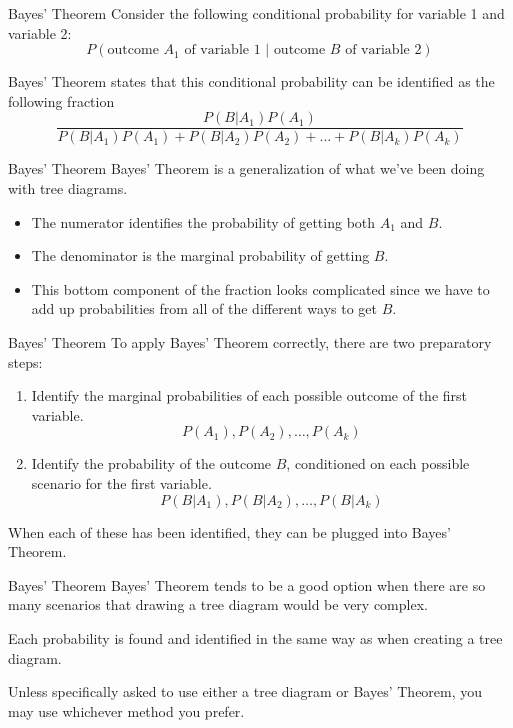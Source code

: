 \begin{frame}{Bayes' Theorem}
    Consider the following conditional probability for variable 1 and variable 2: 
    \[
    P(\text{outcome }A_1\text{ of variable 1 }|\text{ outcome }B\text{ of variable 2})
    \]
    
    Bayes’ Theorem states that this conditional probability can be identified as the following fraction
    \[
        \frac{P(B|A_1)P(A_1)}{P(B|A_1)P(A_1)+P(B|A_2)P(A_2)+\dots +P(B|A_k)P(A_k)}
    \]
\end{frame}

\begin{frame}{Bayes' Theorem}
    Bayes' Theorem is a generalization of what we've been doing with tree diagrams. 
    \begin{itemize}
        \item The numerator identifies the probability of getting both $A_1$ and $B$. 
        \item The denominator is the marginal probability of getting $B$. 
        \item This bottom component of the fraction looks complicated since we have to add up probabilities from all of the different ways to get $B$. 
    \end{itemize}
\end{frame}

\begin{frame}{Bayes' Theorem}
    To apply Bayes’ Theorem correctly, there are two preparatory steps:
    \begin{enumerate}
        \item Identify the marginal probabilities of each possible outcome of the first variable.
        \[
            P(A_1), P(A_2), \dots, P(A_k)
        \]
        \item Identify the probability of the outcome $B$, conditioned on each possible scenario for the first variable.
        \[
            P(B|A_1), P(B|A_2), \dots, P(B|A_k)
        \]
    \end{enumerate}
    When each of these has been identified, they can be plugged into Bayes' Theorem.
\end{frame}

\begin{frame}{Bayes' Theorem}
     Bayes’ Theorem tends to be a good option when there are so many scenarios that drawing a tree diagram would be very complex.
     
     \vspace{12pt}Each probability is found and identified in the same way as when creating a tree diagram.
     
     \vspace{12pt}Unless specifically asked to use either a tree diagram or Bayes' Theorem, you may use whichever method you prefer.
\end{frame}

